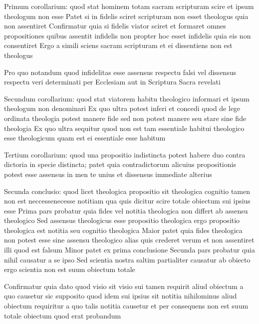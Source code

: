 \documentclass[twoside, openright]{article}
\begin{document}
        \pstart
        Primum corollarium: quod stat hominem totam sacram scripturam scire et ipsum theologum non esse Patet si in fidelis sciret scripturam non esset theologus quia non assentiret Confirmatur quia si fidelis viator sciret et formaret omnes propositiones quibus assentit infidelis non propter hoc esset infidelis quia eis non consentiret Ergo a simili sciens sacram scripturam et ei dissentiens non est theologus
        \pend
     
        \pstart
        Pro quo notandum quod infidelitas esse assensus respectu falsi vel dissensus respectu veri determinati per Ecclesiam aut in Scriptura Sacra revelati
        \pend
     
        \pstart
        Secundum corollarium: quod stat viatorem habitu theologico informari et ipsum theologum non denominari Ex quo ultra potest inferi et concedi quod de lege ordinata theologia potest manere fide sed non potest manere seu stare sine fide theologia Ex quo ultra sequitur quod non est tam essentiale habitui theologico esse theologicum quam est ei essentiale esse habitum 
        \pend
     
        \pstart
        Tertium corollarium: quod una propositio indistincta potest habere duo contra dictoria in specie distincta; patet quia contradictorum alicuius propositionis potest esse assensus in men te unius et dissensus immediate alterius
        \pend
     
        \pstart
        Secunda conclusio: quod licet theologica propositio sit theologica cognitio tamen non est neccessenecesse notitiam qua quis dicitur scire totale obiectum sui ipsius esse Prima pars probatur quia fides vel notitia theologica non differt ab assensu theologico Sed assensus theologicus esse propositio theologica ergo propositio theologica est notitia seu cognitio theologica Maior patet quia fides theologica non potest esse sine assensu theologico alias quis crederet verum et non assentiret illi quod est falsum Minor patet ex prima conclusione Secunda pars probatur quia nihil causatur a se ipso Sed scientia nostra saltim partialiter causatur ab obiecto ergo scientia non est suum obiectum totale
        \pend
     
        \pstart
        Confirmatur quia dato quod visio sit visio sui tamen requirit aliud obiectum a quo causetur sic supposito quod idem sui ipsius sit notitia nihilominus aliud obiectum requiritur a quo talis notitia causetur et per consequens non est suum totale obiectum quod erat probandum
        \pend
     
\end{document}
